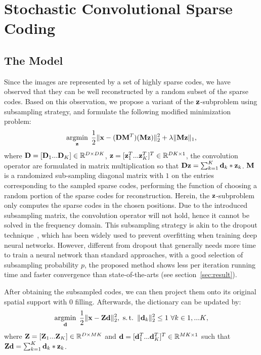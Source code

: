 \section{Stochastic Convolutional Sparse Coding}
\subsection{The Model}
Since the images are represented by a set of highly sparse codes, we have observed that they can be well reconstructed by a random subset of the sparse codes. Based on this observation, we propose a variant of the $\code$-subproblem using subsampling strategy, and formulate the following modified minimization problem:
\begin{equation} \label{eq:updatingCode}
    \minimize{\code} \frac{1}{2}\|\signal - (\Filter \mask^T)(\mask \code) \|_2^2 + \lambda \|\mask \code\|_1,
\end{equation}
where $\Filter = [\Filter_1 ... \Filter_K] \in \mathbb{R}^{D \times DK}$, $\code = [\code_1^T ... \code_K^T]^T \in \mathbb{R}^{DK \times 1}$, the convolution operator are formulated in matrix multiplication so that $ \Filter \code = \sum_{k=1}^{K} \filter_k * \code_k$.  $\mask$ is a randomized sub-sampling diagonal matrix with $1$ on the entries corresponding to the sampled sparse codes, performing the function of choosing a random portion of the sparse codes for reconstruction. Herein, the $\code$-subproblem only computes the sparse codes in the chosen positions. Due to the introduced subsampling matrix, the convolution operator will not hold, hence it cannot be solved in the frequency domain. This subsampling strategy is akin to the dropout technique~\cite{srivastava2014dropout}, which has been widely used to prevent overfitting when training deep neural networks. However, different from dropout that generally needs more time to train a neural network than standard approaches, with a good selection of subsampling probability $p$, the proposed method shows less per iteration running time and faster convergence than state-of-the-arts (see section~\ref{sec:result}).

After obtaining the subsampled codes, we can then project them onto its original spatial support with $0$ filling. Afterwards, the dictionary can be updated by:
\begin{equation} \label{eq:updatingFilter}
    \minimize{\filter} \frac{1}{2}\|\signal - \Code \filter \|_2^2, ~\subjectto ~ \|\filter_k\|^2_2 \leq 1 ~ \forall k \in {1,...K},
\end{equation}
where $\Code= [\Code_1 ... \Code_K] \in \mathbb{R}^{D \times MK}$ and $\filter= [\filter_1^T ... \filter_K^T]^T \in \mathbb{R}^{MK \times 1}$ such that $ \Code \filter = \sum_{k=1}^{K} \filter_k * \code_k$.

